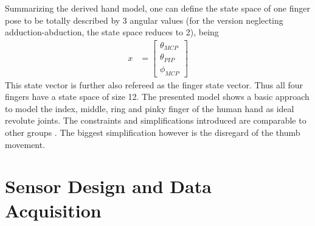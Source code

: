 Summarizing the derived hand model, one can define the state space of one finger pose to be totally described by 3 angular values (for the version neglecting adduction-abduction, the state space reduces to 2), being
\begin{equation*}
\begin{aligned}
x &= \begin{bmatrix}
				\theta_{MCP}\\
				\theta_{PIP}\\
				\phi_{MCP}
\end{bmatrix}
\end{aligned}
\end{equation*}
This state vector is further also refereed as the finger state vector. Thus all four fingers have a state space of size 12. The presented model shows a basic approach to model the index, middle, ring and pinky finger of the human hand as ideal revolute joints. The constraints and simplifications introduced are comparable to other groups \cite{lin2000modeling}. The biggest simplification however is the disregard of the thumb movement.



\section{Sensor Design and Data Acquisition} \label{cha:sensors}

